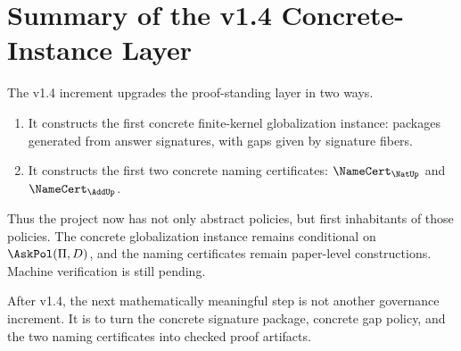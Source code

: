 \chapter{Summary of the v1.4 Concrete-Instance Layer}

The v1.4 increment upgrades the proof-standing layer in two ways.

\begin{enumerate}
  \item It constructs the first concrete finite-kernel globalization instance: packages generated from answer signatures, with gaps given by signature fibers.
  \item It constructs the first two concrete naming certificates: \(\NameCert_{\NatUp}\) and \(\NameCert_{\AddUp}\).
\end{enumerate}

Thus the project now has not only abstract policies, but first inhabitants of those policies. The concrete globalization instance remains conditional on \(\AskPol(\Pi,D)\), and the naming certificates remain paper-level constructions. Machine verification is still pending.

\begin{corollary}
After v1.4, the next mathematically meaningful step is not another governance increment. It is to turn the concrete signature package, concrete gap policy, and the two naming certificates into checked proof artifacts.
\end{corollary}
